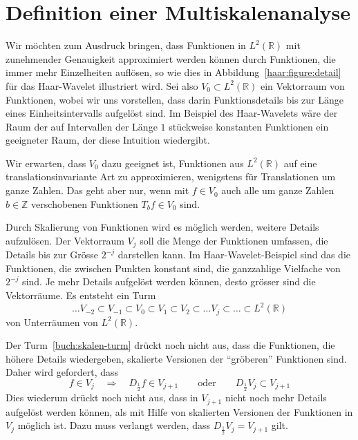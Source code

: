 %
%
%
\section{Definition einer Multiskalenanalyse
\label{section:skalen und vektorraeume}}
Wir möchten zum Ausdruck bringen, dass Funktionen in $L^2(\mathbb R)$
mit zunehmender Genauigkeit approximiert werden können durch Funktionen,
die immer mehr Einzelheiten auflösen, so wie dies in
Abbildung~\ref{haar:figure:detail} für das Haar-Wavelet illustriert wird.
Sei also $V_0\subset L^2(\mathbb R)$ ein Vektorraum von Funktionen, wobei wir
uns vorstellen, dass darin Funktionsdetails bis zur Länge eines
Einheitsintervalls aufgelöst sind.
Im Beispiel des Haar-Wavelets wäre der Raum der auf Intervallen der Länge
$1$ stückweise konstanten Funktionen ein geeigneter Raum,
der diese Intuition wiedergibt.

Wir erwarten, dass $V_0$ dazu geeignet ist, Funktionen aus $L^2(\mathbb R)$
auf eine translationsinvariante Art zu approximieren, wenigstens
für Translationen um ganze Zahlen.
Das geht aber nur, wenn mit $f\in V_0$ auch alle um ganze
Zahlen $b\in\mathbb Z$ verschobenen Funktionen $T_bf\in V_0$ sind.

Durch Skalierung von Funktionen wird es möglich werden, weitere Details
aufzulösen.
Der Vektorraum $V_j$ soll die Menge der Funktionen umfassen, die Details
bis zur Grösse $2^{-j}$ darstellen kann.
Im Haar-Wavelet-Beispiel sind das die Funktionen, die zwischen Punkten
konstant sind, die ganzzahlige Vielfache von $2^{-j}$ sind.
Je mehr Details aufgelöst werden können, desto grösser sind die
Vektorräume.
Es entsteht ein Turm
\begin{equation}
\dots
V_{-2}\subset
V_{-1}\subset
V_0\subset
V_1\subset
V_2\subset
\dots
V_j\subset
\dots
\subset L^2(\mathbb R)
\label{buch:skalen-turm}
\end{equation}
von Unterräumen von $L^2(\mathbb R)$.

Der Turm~\eqref{buch:skalen-turm} drückt noch nicht aus, dass die
Funktionen, die höhere Details wiedergeben, skalierte Versionen der
``gröberen'' Funktionen sind.
Daher wird gefordert, dass
\[
f\in V_j \quad\Rightarrow\quad D_{\frac12}f\in V_{j+1}
\qquad\text{oder}\qquad
D_{\frac12}V_j \subset V_{j+1}
\]
Dies wiederum drückt noch nicht aus, dass in $V_{j+1}$ nicht noch mehr
Details aufgelöst werden können, als mit Hilfe von skalierten Versionen der
Funktionen in $V_j$ möglich ist.
Dazu muss verlangt werden, dass
$D_{\frac12}V_j = V_{j+1}$
gilt.

